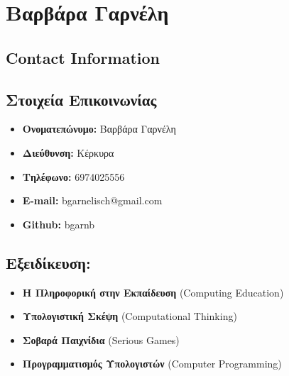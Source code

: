 \documentclass[%
    11pt,
  oneside
  ]{memoir}
\let\oldsection\section
\renewcommand{\section}[1]{%
  \oldsection{#1}
  \leavevmode
  \par
  \vspace{\dimexpr-\baselineskip-\parskip}
}
\begin{document}
      \chapter*{Βαρβάρα Γαρνέλη}
  

  \hypertarget{contact-information}{%
  \section{Contact Information}\label{contact-information}}
    \begin{minipage}[t]{0.3\textwidth}
      
    \end{minipage}
    \begin{minipage}[t]{0.7\textwidth}
                                            \end{minipage}
  \hypertarget{ux3c3ux3c4ux3bfux3b9ux3c7ux3b5ux3afux3b1-ux3b5ux3c0ux3b9ux3baux3bfux3b9ux3bdux3c9ux3bdux3afux3b1ux3c2}{%
\section{Στοιχεία
Επικοινωνίας}\label{ux3c3ux3c4ux3bfux3b9ux3c7ux3b5ux3afux3b1-ux3b5ux3c0ux3b9ux3baux3bfux3b9ux3bdux3c9ux3bdux3afux3b1ux3c2}}

\begin{itemize}
\tightlist
\item
  \textbf{Ονοματεπώνυμο:} Βαρβάρα Γαρνέλη
\item
  \textbf{Διεύθυνση:} Κέρκυρα
\item
  \textbf{Τηλέφωνο:} 6974025556
\item
  \textbf{E-mail:} bgarnelisch@gmail.com
\item
  \textbf{Github:} bgarnb
\end{itemize}

\hypertarget{ux3b5ux3beux3b5ux3b9ux3b4ux3afux3baux3b5ux3c5ux3c3ux3b7}{%
\section{Εξειδίκευση:}\label{ux3b5ux3beux3b5ux3b9ux3b4ux3afux3baux3b5ux3c5ux3c3ux3b7}}

\begin{itemize}
\tightlist
\item
  \textbf{Η Πληροφορική στην Εκπαίδευση} (Computing Education)
\item
  \textbf{Υπολογιστική Σκέψη} (Computational Thinking)
\item
  \textbf{Σοβαρά Παιχνίδια} (Serious Games)
\item
  \textbf{Προγραμματισμός Υπολογιστών} (Computer Programming)
\end{itemize}
\end{document}
